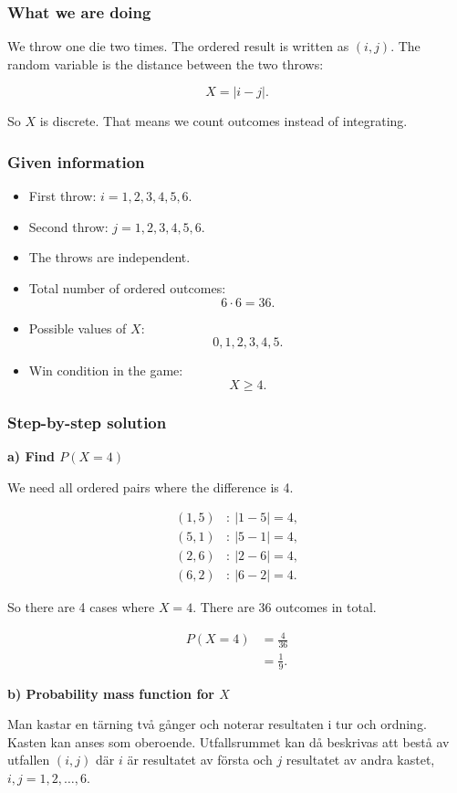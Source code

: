 \documentclass[10pt]{article}
\begin{document}
\subsubsection*{What we are doing}
We throw one die two times.
The ordered result is written as \((i,j)\).
The random variable is the distance between the two throws:

\[
X=|i-j|.
\]

So \(X\) is discrete.
That means we count outcomes instead of integrating.

\subsubsection*{Given information}
\begin{itemize}
\item
First throw: \(i=1,2,3,4,5,6\).
\item
Second throw: \(j=1,2,3,4,5,6\).
\item
The throws are independent.
\item
Total number of ordered outcomes:
\[
6\cdot 6=36.
\]
\item
Possible values of \(X\):
\[
0,1,2,3,4,5.
\]
\item
Win condition in the game:
\[
X\ge 4.
\]
\end{itemize}

\subsubsection*{Step-by-step solution}

\textbf{a) Find \(P(X=4)\)}

We need all ordered pairs where the difference is 4.

\begin{align*}
(1,5)&:\ |1-5|=4,\\
(5,1)&:\ |5-1|=4,\\
(2,6)&:\ |2-6|=4,\\
(6,2)&:\ |6-2|=4.
\end{align*}

So there are 4 cases where \(X=4\).
There are 36 outcomes in total.

\begin{align*}
P(X=4)
&=
\frac{4}{36}\\[2mm]
&=
\frac{1}{9}.
\end{align*}

\textbf{b) Probability mass function for \(X\)}

Man kastar en tärning två gånger och noterar resultaten i tur och ordning.
Kasten kan anses som oberoende. Utfallsrummet kan då beskrivas att bestå av
utfallen \((i,j)\) där \(i\) är resultatet av första och \(j\) resultatet
av andra kastet, \(i,j=1,2,\ldots,6\).
\end{document}
